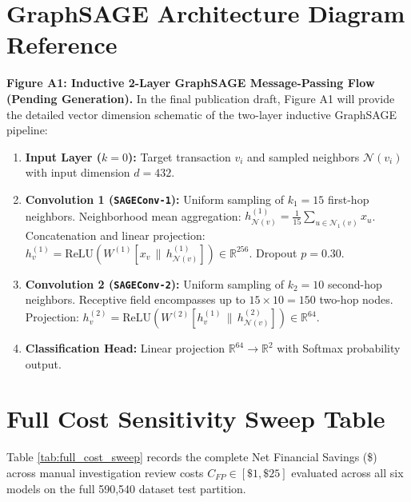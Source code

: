 \documentclass[11pt,a4paper]{report}
\begin{document}
\appendix

\chapter{GraphSAGE Architecture Diagram Reference}
\label{app:graphsage_arch}
\textbf{Figure A1: Inductive 2-Layer GraphSAGE Message-Passing Flow (Pending Generation).}
In the final publication draft, Figure A1 will provide the detailed vector dimension schematic of the two-layer inductive GraphSAGE pipeline:
\begin{enumerate}
    \item \textbf{Input Layer ($k=0$):} Target transaction $v_i$ and sampled neighbors $\mathcal{N}(v_i)$ with input dimension $d = 432$.
    \item \textbf{Convolution 1 (\texttt{SAGEConv-1}):} 
    Uniform sampling of $k_1 = 15$ first-hop neighbors. Neighborhood mean aggregation:
    $h_{\mathcal{N}(v)}^{(1)} = \frac{1}{15} \sum_{u \in \mathcal{N}_1(v)} x_u$.
    Concatenation and linear projection: $h_v^{(1)} = \text{ReLU}\left(W^{(1)} [x_v \,\|\, h_{\mathcal{N}(v)}^{(1)}]\right) \in \mathbb{R}^{256}$.
    Dropout $p = 0.30$.
    \item \textbf{Convolution 2 (\texttt{SAGEConv-2}):}
    Uniform sampling of $k_2 = 10$ second-hop neighbors. Receptive field encompasses up to $15 \times 10 = 150$ two-hop nodes.
    Projection: $h_v^{(2)} = \text{ReLU}\left(W^{(2)} [h_v^{(1)} \,\|\, h_{\mathcal{N}(v)}^{(2)}]\right) \in \mathbb{R}^{64}$.
    \item \textbf{Classification Head:} Linear projection $\mathbb{R}^{64} \rightarrow \mathbb{R}^2$ with Softmax probability output.
\end{enumerate}

\chapter{Full Cost Sensitivity Sweep Table}
\label{app:cost_sweep}
Table \ref{tab:full_cost_sweep} records the complete Net Financial Savings (\$) across manual investigation review costs $C_{FP} \in [\$1, \$25]$ evaluated across all six models on the full 590,540 dataset test partition.
\end{document}
